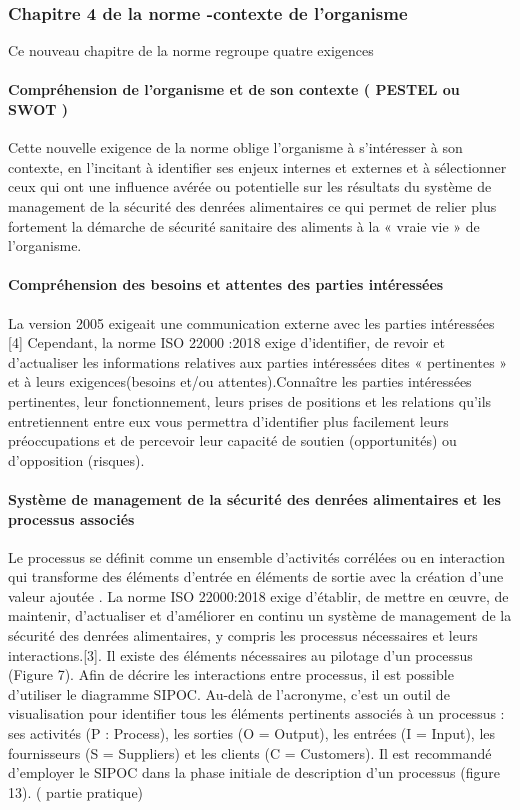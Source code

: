 \begin{spacing}{1.2}
\subsubsection{Chapitre 4 de la norme -contexte de l’organisme }
Ce nouveau chapitre de la norme regroupe quatre exigences
\paragraph{Compréhension de l’organisme et de son contexte ( PESTEL ou SWOT ) }
Cette nouvelle  exigence de la norme oblige l’organisme à s’intéresser à son contexte, en l’incitant à identifier ses enjeux internes et externes et à sélectionner ceux qui ont une influence avérée ou potentielle sur les résultats du système de management de la sécurité des denrées alimentaires  ce qui permet de relier  plus fortement la démarche de sécurité sanitaire des aliments à la « vraie vie » de l’organisme.
\paragraph{Compréhension des besoins et attentes des parties intéressées}
La  version 2005 exigeait  une communication externe avec les parties intéressées [4] Cependant, la norme ISO 22000 :2018 exige  d’identifier, de revoir et d’actualiser les informations relatives aux parties intéressées dites « pertinentes »  et à leurs exigences(besoins et/ou attentes).Connaître les parties intéressées pertinentes, leur fonctionnement, leurs prises de positions et les relations qu’ils entretiennent entre eux vous permettra d’identifier plus facilement leurs préoccupations et de percevoir leur capacité de soutien (opportunités) ou d’opposition (risques).
\paragraph{Système de management de la sécurité des denrées alimentaires et les processus associés }

Le processus se définit comme un ensemble d’activités corrélées ou en interaction qui transforme des éléments d’entrée en éléments de sortie avec la création d’une valeur ajoutée .
La norme ISO 22000:2018 exige d’établir, de mettre en œuvre, de maintenir, d’actualiser et d’améliorer en continu un système de management de la sécurité des denrées alimentaires, y compris les processus nécessaires et leurs interactions.[3]. Il existe des éléments nécessaires au pilotage d’un processus (Figure 7). Afin de décrire les interactions entre processus, il est possible d’utiliser le diagramme SIPOC. Au-delà de l’acronyme, c’est un outil de visualisation pour identifier tous les éléments pertinents associés à un processus : ses activités (P : Process), les sorties (O = Output), les entrées (I = Input), les fournisseurs (S = Suppliers) et les clients (C = Customers). Il est recommandé d’employer le SIPOC dans la phase initiale de description d’un processus (figure 13). ( partie pratique)


\end{spacing}
